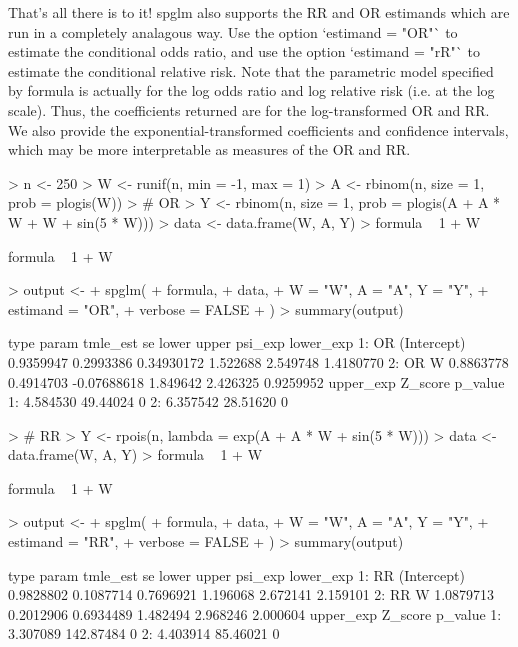 \documentclass{article}
\begin{document}
That's all there is to it! spglm also supports the RR and OR estimands which are run in a completely analagous way. Use the option `estimand = "OR"` to estimate the conditional odds ratio, and use the option `estimand = "rR"` to estimate the conditional relative risk. Note that the parametric model specified by formula is actually for the log odds ratio and log relative risk (i.e. at the log scale). Thus, the coefficients returned are for the log-transformed OR and RR. We also provide the exponential-transformed coefficients and confidence intervals, which may be more interpretable as measures of the OR and RR.

\begin{Schunk}
\begin{Sinput}
> n <- 250
> W <- runif(n, min = -1, max = 1)
> A <- rbinom(n, size = 1, prob = plogis(W))
> # OR
> Y <- rbinom(n, size = 1, prob = plogis(A + A * W + W + sin(5 * W)))
> data <- data.frame(W, A, Y)
> formula ~ 1 + W
\end{Sinput}
\begin{Soutput}
formula ~ 1 + W
\end{Soutput}
\begin{Sinput}
> output <-
+   spglm(
+     formula,
+     data,
+     W = "W", A = "A", Y = "Y",
+     estimand = "OR",
+     verbose = FALSE
+   )
> summary(output)
\end{Sinput}
\begin{Soutput}
   type       param  tmle_est        se       lower    upper  psi_exp lower_exp
1:   OR (Intercept) 0.9359947 0.2993386  0.34930172 1.522688 2.549748 1.4180770
2:   OR           W 0.8863778 0.4914703 -0.07688618 1.849642 2.426325 0.9259952
   upper_exp  Z_score p_value
1:  4.584530 49.44024       0
2:  6.357542 28.51620       0
\end{Soutput}
\begin{Sinput}
> # RR
> Y <- rpois(n, lambda = exp(A + A * W + sin(5 * W)))
> data <- data.frame(W, A, Y)
> formula ~ 1 + W
\end{Sinput}
\begin{Soutput}
formula ~ 1 + W
\end{Soutput}
\begin{Sinput}
> output <-
+   spglm(
+     formula,
+     data,
+     W = "W", A = "A", Y = "Y",
+     estimand = "RR",
+     verbose = FALSE
+   )
> summary(output)
\end{Sinput}
\begin{Soutput}
   type       param  tmle_est        se     lower    upper  psi_exp lower_exp
1:   RR (Intercept) 0.9828802 0.1087714 0.7696921 1.196068 2.672141  2.159101
2:   RR           W 1.0879713 0.2012906 0.6934489 1.482494 2.968246  2.000604
   upper_exp   Z_score p_value
1:  3.307089 142.87484       0
2:  4.403914  85.46021       0
\end{Soutput}
\end{Schunk}
\end{document}
